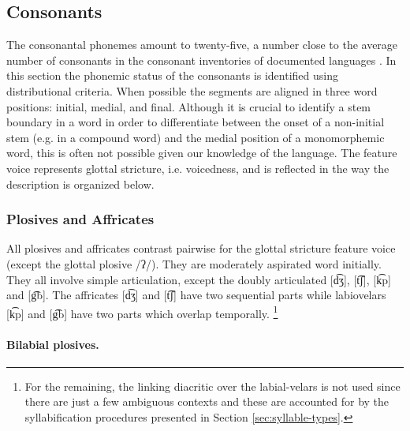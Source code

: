 \subsection{Consonants}
\label{sec:conso}  


The consonantal phonemes amount to twenty-five, a number close to the average
number of consonants in the consonant inventories of  documented  languages
\citep{Madd09}. In this section the phonemic status of the consonants is
identified using distributional criteria. When possible the segments are aligned
in three word positions:  initial, medial,  and final. Although it is crucial 
to
identify a stem boundary in a word in order to differentiate between the onset
of a non-initial stem (e.g. in a compound word) and the medial position of a
monomorphemic word,  this
  is often not possible given our knowledge of the language. The feature
{\sc voice} represents glottal stricture, i.e. voicedness, and is reflected in
the way  the description is organized below.

   
\subsubsection{Plosives and Affricates}

All plosives and affricates contrast pairwise for the glottal stricture feature 
{\sc voice} (except  the glottal plosive /{\sls ʔ}/). They are moderately 
aspirated word initially. They all involve simple articulation, except  the 
doubly articulated [{\sls  d͡ʒ}], [{\sls t͡ʃ}], [{\sls k͡p}] and [{\sls g͡b}].  
The 
affricates  [{\sls  d͡ʒ}]  and [{\sls t͡ʃ}] have two sequential parts while  
labiovelars  [{\sls k͡p}] and [{\sls g͡b}] have two parts which overlap 
temporally. \footnote{For the remaining,  the linking diacritic over the 
labial-velars is not used  since there are just a few ambiguous contexts and 
these are accounted for by the syllabification procedures presented in  Section 
\ref{sec:syllable-types}.}


\paragraph{Bilabial plosives.}


